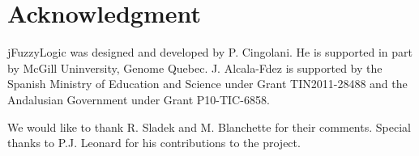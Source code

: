 \documentclass[conference]{IEEEtran}
\begin{document}
\section*{Acknowledgment}

jFuzzyLogic was designed and developed by P. Cingolani. 
He is supported in part by McGill Uninversity, Genome Quebec.
J. Alcala-Fdez is supported by the Spanish Ministry of Education and Science under Grant TIN2011-28488 and the Andalusian Government under Grant P10-TIC-6858. 

We would like to thank R. Sladek and M. Blanchette for their comments. Special thanks to P.J. Leonard for his contributions to the project.





\end{document}
